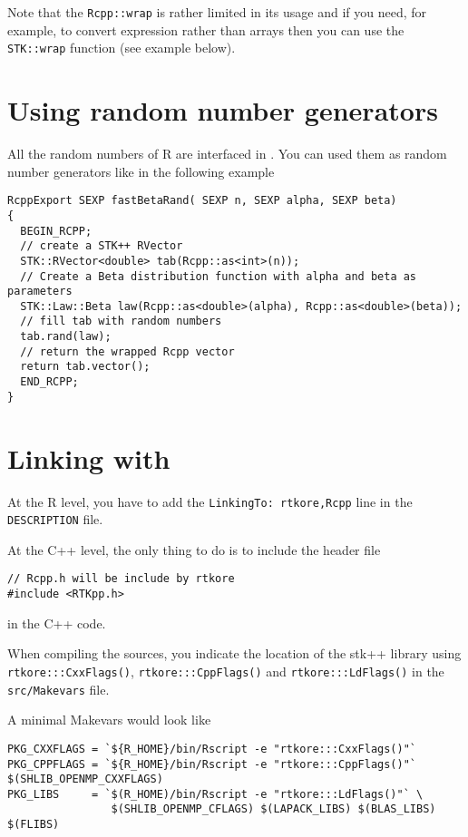 \documentclass[a4paper,10pt]{article}
\begin{document}
Note that the \texttt{Rcpp::wrap} is rather limited in its usage and if you
need, for example, to convert expression rather than arrays then you can use the
\texttt{STK::wrap} function (see example below).

\section{Using \rtkore{} random number generators}

All the random numbers of R are interfaced in \rtkore{}. You can used them as
\stkpp{} random number generators like in the following example

\begin{lstlisting}[style=customcpp]
RcppExport SEXP fastBetaRand( SEXP n, SEXP alpha, SEXP beta)
{
  BEGIN_RCPP;
  // create a STK++ RVector
  STK::RVector<double> tab(Rcpp::as<int>(n));
  // Create a Beta distribution function with alpha and beta as parameters
  STK::Law::Beta law(Rcpp::as<double>(alpha), Rcpp::as<double>(beta));
  // fill tab with random numbers
  tab.rand(law);
  // return the wrapped Rcpp vector
  return tab.vector();
  END_RCPP;
}
\end{lstlisting}


\section{Linking with \rtkore{}}

At the R level, you have to add the \texttt{LinkingTo: rtkore,Rcpp} line in the
\verb+DESCRIPTION+ file.

\noindent At the C++ level, the only thing to do is to include the header file
\begin{lstlisting}[style=customcpp]
// Rcpp.h will be include by rtkore
#include <RTKpp.h>
\end{lstlisting}
in the C++ code.

When compiling the sources, you indicate the location of the stk++ library using
\verb+rtkore:::CxxFlags()+, \verb+rtkore:::CppFlags()+ and
\verb+rtkore:::LdFlags()+ in the \texttt{src/Makevars} file.

A minimal Makevars would look like
\begin{verbatim}
PKG_CXXFLAGS = `${R_HOME}/bin/Rscript -e "rtkore:::CxxFlags()"`
PKG_CPPFLAGS = `${R_HOME}/bin/Rscript -e "rtkore:::CppFlags()"` $(SHLIB_OPENMP_CXXFLAGS)
PKG_LIBS     = `$(R_HOME)/bin/Rscript -e "rtkore:::LdFlags()"` \
                $(SHLIB_OPENMP_CFLAGS) $(LAPACK_LIBS) $(BLAS_LIBS) $(FLIBS)
\end{verbatim}
\end{document}
